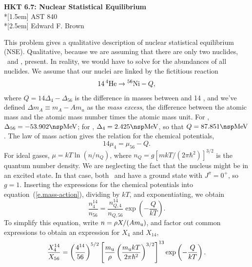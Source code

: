 \documentclass[11pt]{article}
\begin{document}
\newcommand{\thetitle}{HKT 6.7: Nuclear Statistical Equilibrium}
\newcommand{\thecourse}{AST 840}
\newcommand{\theauthor}{Edward F. Brown}

\begin{titlepage}
\begin{center}
\LARGE{\textbf{\thetitle}}\\*[1.5em]
\Large{\thecourse}\\*[2.5em]
\large{\theauthor}
\end{center}
\end{titlepage}

This problem gives a qualitative description of nuclear statistical equilibrium (NSE).  Qualitative, because we are assuming that there are only two nuclides, \helium\ and \nickel[56], present. In reality, we would have to solve for the abundances of all nuclides.  We assume that our nuclei are linked by the fictitious reaction
\begin{equation}\label{e.chem}
14\,\helium \to \nickel[56] - Q,
\end{equation}
where $Q = 14\Delta_{4} - \Delta_{56}$ is the difference in masses between \nickel[56] and 14 \helium, and we've defined $\Delta m_{A} \equiv m_{A} - A m_{u}$ as the \emph{mass excess}, the difference between the atomic mass and the atomic mass number times the atomic mass unit.  For \nickel[56], $\Delta_{56} = -53.902\nsp\MeV$; for \helium, $\Delta_{4} = 2.425\nsp\MeV$, so that $Q = 87.851\nsp\MeV$. The law of mass action gives the relation for the chemical potentials,
\begin{equation}\label{e.mass-action}
14\mu_{4} = \mu_{56} - Q.
\end{equation}
For ideal gases, $\mu = kT\ln(n/n_{Q})$, where $n_{Q}=g[mkT/(2\pi\hbar^{2})]^{3/2}$ is the quantum number density.  We are neglecting the fact that the nucleus might be in an excited state. In that case, both \helium\ and \nickel[56] have a ground state with $J^{\pi} = 0^{+}$, so $g = 1$.  Inserting the expressions for the chemical potentials into equation~(\ref{e.mass-action}), dividing by $kT$, and exponentiating, we obtain
\begin{equation}\label{e.nse-1}
\frac{n_{4}^{14}}{n_{56}} = \frac{n_{Q,4}^{14}}{n_{Q,56}} \exp\left(-\frac{Q}{kT}\right).
\end{equation}
To simplify this equation, write $n = \rho X/(A\mb)$, and factor out common expressions to obtain an expression for $X_{4}$ and $X_{14}$,
\begin{equation}\label{e.nse-2}
\frac{X_{4}^{14}}{X_{56}} = \left(\frac{4^{14}}{56}\right)^{5/2}\left[\frac{\mb}{\rho}\left(\frac{\mb kT}{2\pi\hbar^{2}}\right)^{3/2}\right]^{13}\exp\left(-\frac{Q}{kT}\right).
\end{equation}
\end{document}
